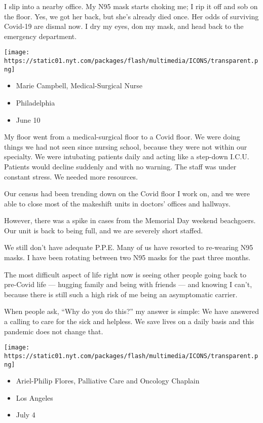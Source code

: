 I slip into a nearby office. My N95 mask starts choking me; I rip it off
and sob on the floor. Yes, we got her back, but she's already died once.
Her odds of surviving Covid-19 are dismal now. I dry my eyes, don my
mask, and head back to the emergency department.

\texttt{[image: https://static01.nyt.com/packages/flash/multimedia/ICONS/transparent.png]}

\begin{itemize}
\tightlist
\item
  Marie Campbell, Medical-Surgical Nurse
\item
  Philadelphia
\item
  June 10
\end{itemize}

My floor went from a medical-surgical floor to a Covid floor. We were
doing things we had not seen since nursing school, because they were not
within our specialty. We were intubating patients daily and acting like
a step-down I.C.U. Patients would decline suddenly and with no warning.
The staff was under constant stress. We needed more resources.

Our census had been trending down on the Covid floor I work on, and we
were able to close most of the makeshift units in doctors' offices and
hallways.

However, there was a spike in cases from the Memorial Day weekend
beachgoers. Our unit is back to being full, and we are severely short
staffed.

We still don't have adequate P.P.E. Many of us have resorted to
re-wearing N95 masks. I have been rotating between two N95 masks for the
past three months.

The most difficult aspect of life right now is seeing other people going
back to pre-Covid life --- hugging family and being with friends --- and
knowing I can't, because there is still such a high risk of me being an
asymptomatic carrier.

When people ask, ``Why do you do this?'' my answer is simple: We have
answered a calling to care for the sick and helpless. We save lives on a
daily basis and this pandemic does not change that.

\texttt{[image: https://static01.nyt.com/packages/flash/multimedia/ICONS/transparent.png]}

\begin{itemize}
\tightlist
\item
  Ariel-Philip Flores, Palliative Care and Oncology Chaplain
\item
  Los Angeles
\item
  July 4
\end{itemize}

